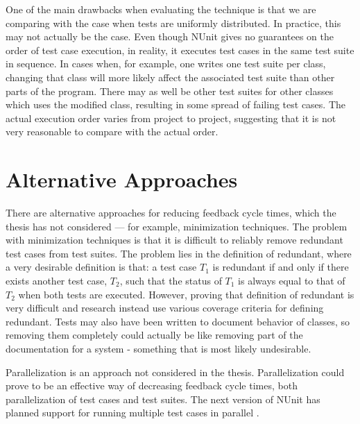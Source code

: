 \documentclass[a4paper,english,12pt]{report}
\begin{document}
One of the main drawbacks when evaluating the technique is that we are comparing with the case when tests are uniformly distributed. In practice, this may not actually be the case. Even though NUnit gives no guarantees on the order of test case execution, in reality, it executes test cases in the same test suite in sequence. In cases when, for example, one writes one test suite per class, changing that class will more likely affect the associated test suite than other parts of the program. There may as well be other test suites for other classes which uses the modified class, resulting in some spread of failing test cases. The actual execution order varies from project to project, suggesting that it is not very reasonable to compare with the actual order.

\section{Alternative Approaches}\label{sec:alternative-approaches}
There are alternative approaches for reducing feedback cycle times, which the thesis has not considered --- for example, minimization techniques. The problem with minimization techniques is that it is difficult to reliably remove redundant test cases from test suites. The problem lies in the definition of redundant, where a very desirable definition is that: a test case $T_1$ is redundant if and only if there exists another test case, $T_2$, such that the status of $T_1$ is always equal to that of $T_2$ when both tests are executed. However, proving that definition of redundant is very difficult and research instead use various coverage criteria for defining redundant. Tests may also have been written to document behavior of classes, so removing them completely could actually be like removing part of the documentation for a system - something that is most likely undesirable.

Parallelization is an approach not considered in the thesis. Parallelization could prove to be an effective way of decreasing feedback cycle times, both parallelization of test cases and test suites. The next version of NUnit has planned support for running multiple test cases in parallel \citep{poole2013parallel}.
\end{document}

